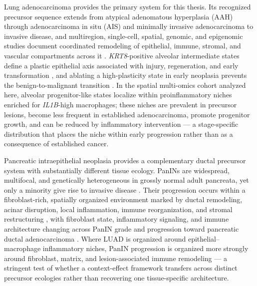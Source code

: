 Lung adenocarcinoma provides the primary system for this thesis. Its
recognized precursor sequence extends from atypical adenomatous hyperplasia
(AAH) through adenocarcinoma in situ (AIS) and minimally invasive
adenocarcinoma to invasive disease, and multiregion, single-cell, spatial,
genomic, and epigenomic studies document coordinated remodeling of epithelial,
immune, stromal, and vascular compartments across it
\autocite{Sinjab2021-in,Zhu2022-hz,Haga2023-xc,Chen2025-zo}. \emph{KRT8}-positive
alveolar intermediate states define a plastic epithelial axis associated with
injury, regeneration, and early transformation \autocite{Wang2023-hg}, and
ablating a high-plasticity state in early neoplasia prevents the
benign-to-malignant transition \autocite{Chan2026-ov}. In the spatial
multi-omics cohort analyzed here, alveolar progenitor-like states localize
within proinflammatory niches enriched for \emph{IL1B}-high macrophages; these
niches are prevalent in precursor lesions, become less frequent in established
adenocarcinoma, promote progenitor growth, and can be reduced by inflammatory
intervention \autocite{Peng2025-xu} --- a stage-specific distribution that
places the niche within early progression rather than as a consequence of
established cancer.

Pancreatic intraepithelial neoplasia provides a complementary ductal precursor
system with substantially different tissue ecology. PanINs are widespread,
multifocal, and genetically heterogeneous in grossly normal adult pancreata,
yet only a minority give rise to invasive disease
\autocite{Braxton2024-sv,Kiemen2024-xk}. Their progression occurs within a
fibroblast-rich, spatially organized environment marked by ductal remodeling,
acinar disruption, local inflammation, immune reorganization, and stromal
restructuring \autocite{Carpenter2023-qs,Bell2024-kn,Lyman2025-qg,Kiemen2026-dz},
with fibroblast state, inflammatory signaling, and immune architecture
changing across PanIN grade and progression toward pancreatic ductal
adenocarcinoma \autocite{Bell2024-kn,Lyman2025-qg}. Where LUAD is organized
around epithelial--macrophage inflammatory niches, PanIN progression is
organized more strongly around fibroblast, matrix, and lesion-associated
immune remodeling --- a stringent test of whether a context-effect framework
transfers across distinct precursor ecologies rather than recovering one
tissue-specific architecture.

